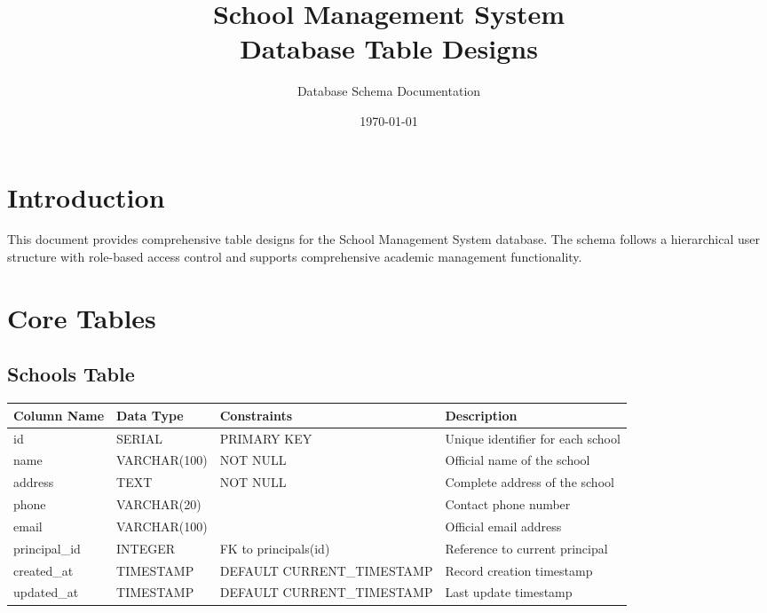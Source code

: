 \documentclass[11pt,a4paper]{article}
\title{\textbf{School Management System\\Database Table Designs}}
\author{Database Schema Documentation}
\date{\today}
\begin{document}
\maketitle

\tableofcontents
\newpage

\section{Introduction}
This document provides comprehensive table designs for the School Management System database. The schema follows a hierarchical user structure with role-based access control and supports comprehensive academic management functionality.

\section{Core Tables}

\subsection{Schools Table}
\begin{longtable}{|p{3.5cm}|p{2.5cm}|p{3cm}|p{5.5cm}|}
\hline
\textbf{Column Name} & \textbf{Data Type} & \textbf{Constraints} & \textbf{Description} \\
\hline
\endhead
id & SERIAL & PRIMARY KEY & Unique identifier for each school \\
\hline
name & VARCHAR(100) & NOT NULL & Official name of the school \\
\hline
address & TEXT & NOT NULL & Complete address of the school \\
\hline
phone & VARCHAR(20) & & Contact phone number \\
\hline
email & VARCHAR(100) & & Official email address \\
\hline
principal\_id & INTEGER & FK to principals(id) & Reference to current principal \\
\hline
created\_at & TIMESTAMP & DEFAULT CURRENT\_TIMESTAMP & Record creation timestamp \\
\hline
updated\_at & TIMESTAMP & DEFAULT CURRENT\_TIMESTAMP & Last update timestamp \\
\hline
\end{longtable}
\end{document}
